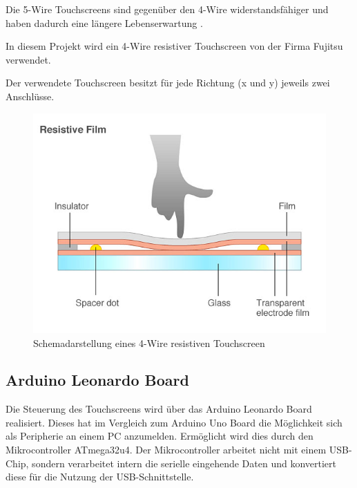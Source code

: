 Die 5-Wire Touchscreens sind gegenüber den 4-Wire widerstandsfähiger und haben dadurch eine längere Lebenserwartung \cite{5w4w}.

In diesem Projekt wird ein 4-Wire resistiver Touchscreen von der Firma Fujitsu verwendet.

Der verwendete Touchscreen besitzt für jede Richtung (x und y) jeweils zwei Anschlüsse.
\begin{figure}
    \centering
    \includegraphics[width=0.6\linewidth]{fig/raster/4_wire_resistive_touch_screen.jpeg}
    \caption{Schemadarstellung eines 4-Wire resistiven Touchscreen \cite{4wschema}}
    \label{fig:4w}
\end{figure}
\subsection{Arduino Leonardo Board}
Die Steuerung des Touchscreens wird über das Arduino Leonardo Board realisiert. 
Dieses hat im Vergleich zum Arduino Uno Board die Möglichkeit sich als Peripherie an einem PC anzumelden.
Ermöglicht wird dies durch den Mikrocontroller ATmega32u4.
Der Mikrocontroller arbeitet nicht mit einem USB-Chip, sondern verarbeitet intern die serielle eingehende Daten und konvertiert diese für die Nutzung der USB-Schnittstelle.





